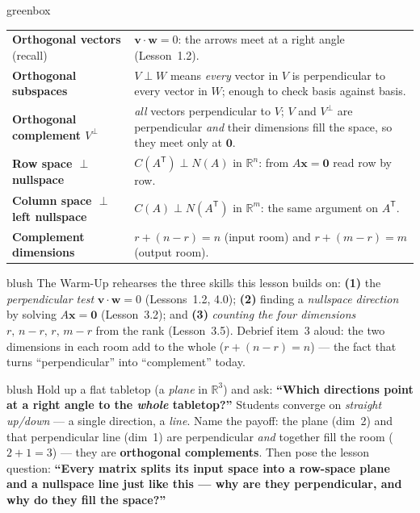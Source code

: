 \documentclass[10pt]{article}
\newcommand{\vv}{\mathbf{v}}
\newcommand{\ww}{\mathbf{w}}
\newcommand{\xx}{\mathbf{x}}
\newcommand{\zero}{\mathbf{0}}
\newcommand{\T}{\mathsf{T}}
\begin{document}
\begin{skillbox}{greenbox}
\renewcommand{\arraystretch}{1.3}
\begin{tabularx}{\linewidth}{@{}l X@{}}
\textbf{Orthogonal vectors} (recall) & $\vv\cdot\ww=0$: the arrows meet at a right angle (Lesson~1.2). \\
\textbf{Orthogonal subspaces} & $V\perp W$ means \emph{every} vector in $V$ is perpendicular to every vector in $W$; enough to check basis against basis. \\
\textbf{Orthogonal complement $V^{\perp}$} & \emph{all} vectors perpendicular to $V$; $V$ and $V^{\perp}$ are perpendicular \emph{and} their dimensions fill the space, so they meet only at $\zero$. \\
\textbf{Row space $\perp$ nullspace} & $C(A^{\T})\perp N(A)$ in $\mathbb{R}^n$: from $A\xx=\zero$ read row by row. \\
\textbf{Column space $\perp$ left nullspace} & $C(A)\perp N(A^{\T})$ in $\mathbb{R}^m$: the same argument on $A^{\T}$. \\
\textbf{Complement dimensions} & $r+(n-r)=n$ (input room) and $r+(m-r)=m$ (output room). \\
\end{tabularx}
\end{skillbox}

\begin{fixedskillbox}{blush}
    The Warm-Up rehearses the three skills this lesson builds on:
    \textbf{(1)} the \emph{perpendicular test} $\vv\cdot\ww=0$ (Lessons~1.2, 4.0);
    \textbf{(2)} finding a \emph{nullspace direction} by solving $A\xx=\zero$ (Lesson~3.2); and
    \textbf{(3)} \emph{counting the four dimensions} $r,\,n-r,\,r,\,m-r$ from the rank (Lesson~3.5).
    Debrief item~3 aloud: the two dimensions in each room add to the whole ($r+(n-r)=n$) --- the fact
    that turns ``perpendicular'' into ``complement'' today.
\end{fixedskillbox}

\begin{skillbox}[Hook]{blush}
    Hold up a flat tabletop (a \emph{plane} in $\mathbb{R}^3$) and ask:
    \textbf{``Which directions point at a right angle to the \emph{whole} tabletop?''} Students converge
    on \emph{straight up/down} --- a single direction, a \emph{line}. Name the payoff: the plane (dim~2)
    and that perpendicular line (dim~1) are perpendicular \emph{and} together fill the room
    ($2+1=3$) --- they are \textbf{orthogonal complements}. Then pose the lesson question:
    \textbf{``Every matrix splits its input space into a row-space plane and a nullspace line just like
    this --- why are they perpendicular, and why do they fill the space?''}
\end{skillbox}
\end{document}
